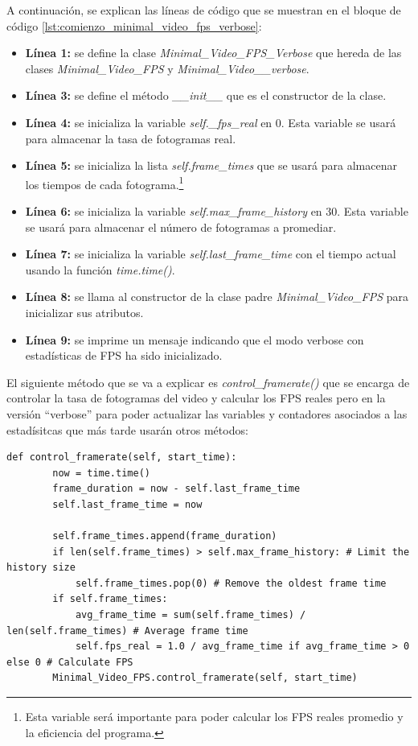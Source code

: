 A continuación, se explican las líneas de código que se muestran en el bloque de código \ref{lst:comienzo_minimal_video_fps_verbose}:
\begin{itemize}
    \item \textbf{Línea 1:} se define la clase \textit{Minimal\_Video\_FPS\_Verbose} que hereda de las clases \textit{Minimal\_Video\_FPS} y \textit{Minimal\_Video\_\_verbose}.
    \item \textbf{Línea 3:} se define el método \textit{\_\_init\_\_} que es el constructor de la clase.
    \item \textbf{Línea 4:} se inicializa la variable \textit{self.\_fps\_real} en 0. Esta variable se usará para almacenar la tasa de fotogramas real.
    \item \textbf{Línea 5:} se inicializa la lista \textit{self.frame\_times} que se usará para almacenar los tiempos de cada fotograma.\footnote{Esta variable será importante para poder calcular los FPS reales promedio y la eficiencia del programa.}
    \item \textbf{Línea 6:} se inicializa la variable \textit{self.max\_frame\_history} en 30. Esta variable se usará para almacenar el número de fotogramas a promediar.
    \item \textbf{Línea 7:} se inicializa la variable \textit{self.last\_frame\_time} con el tiempo actual usando la función \textit{time.time()}.
    \item \textbf{Línea 8:} se llama al constructor de la clase padre \textit{Minimal\_Video\_FPS} para inicializar sus atributos.
    \item \textbf{Línea 9:} se imprime un mensaje indicando que el modo verbose con estadísticas de FPS ha sido inicializado.
\end{itemize}
\vspace{\baselineskip}

El siguiente método que se va a explicar es \textit{control\_framerate()} que se encarga de controlar la tasa de fotogramas del video y calcular los FPS reales pero en la versión ``verbose'' para poder actualizar las variables y contadores asociados a las estadísitcas que más tarde usarán otros métodos:
\begin{lstlisting}[style=pythonstyle, caption={Método control\_framerate() de \textit{Minimal\_Video\_FPS}}, label={lst:control_framerate_minimal_video_fps_verbose}]
def control_framerate(self, start_time):
        now = time.time()
        frame_duration = now - self.last_frame_time
        self.last_frame_time = now

        self.frame_times.append(frame_duration)
        if len(self.frame_times) > self.max_frame_history: # Limit the history size
            self.frame_times.pop(0) # Remove the oldest frame time
        if self.frame_times:
            avg_frame_time = sum(self.frame_times) / len(self.frame_times) # Average frame time
            self.fps_real = 1.0 / avg_frame_time if avg_frame_time > 0 else 0 # Calculate FPS
        Minimal_Video_FPS.control_framerate(self, start_time)
\end{lstlisting}
\vspace{\baselineskip}

